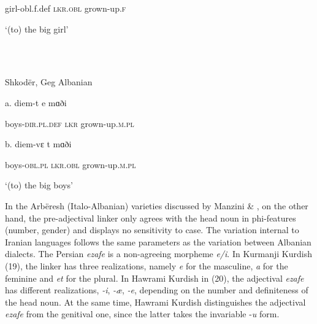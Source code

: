 \documentclass[output=paper]{langsci/langscibook}
\begin{document}
\begin{styleSfondomedioiColorexxi}
girl-obl.f.def    \textsc{lkr.obl}  grown-up.\textsc{f}
\end{styleSfondomedioiColorexxi}

\begin{styleSfondomedioiColorexxi}
    ‘(to) the big girl’
\end{styleSfondomedioiColorexxi}

\begin{styleSfondomedioiColorexxi}
\ea%
    \label{ex:key:18}
    \gll\\
        \\
    \glt
    \z

          Shkodër, Geg Albanian 
\end{styleSfondomedioiColorexxi}

\begin{styleSfondomedioiColorexxi}
a.  diem-t     e   mɑði     
\end{styleSfondomedioiColorexxi}

\begin{styleSfondomedioiColorexxi}
boys-\textsc{dir.pl.def}  \textsc{lkr}  grown-up.\textsc{m.pl}  
\end{styleSfondomedioiColorexxi}

\begin{styleSfondomedioiColorexxi}
b.  diem-vɛ    t     mɑði 
\end{styleSfondomedioiColorexxi}

\begin{styleSfondomedioiColorexxi}
boys-\textsc{obl.pl}     \textsc{lkr.obl}  grown-up.\textsc{m.pl}
\end{styleSfondomedioiColorexxi}

\begin{styleSfondomedioiColorexxi}
‘(to) the big boys’  
\end{styleSfondomedioiColorexxi}

\begin{styleSfondomedioiColorexxi}
In the Arbëresh (Italo-Albanian) varieties discussed by Manzini \& \citet{Savoia2011a}, on the other hand, the pre-adjectival linker only agrees with the head noun in phi-features (number, gender) and displays no sensitivity to case. The variation internal to Iranian languages follows the same parameters as the variation between Albanian dialects. The Persian \textit{ezafe} is a non-agreeing morpheme \textit{e/i}. In Kurmanji Kurdish (19), the linker has three realizations, namely \textit{e} for the masculine, \textit{a} for the feminine and \textit{et} for the plural. In Hawrami Kurdish in (20), the adjectival \textit{ezafe} has different realizations, \textit{{}-i}, \textit{{}-æ}, \textit{{}-e}, depending on the number and definiteness of the head noun. At the same time, Hawrami Kurdish distinguishes the adjectival \textit{ezafe} from the genitival one, since the latter takes the invariable -\textit{u} form.
\end{styleSfondomedioiColorexxi}
\end{document}
